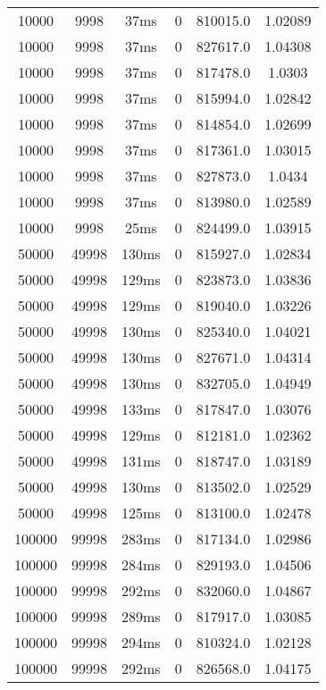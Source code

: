\documentclass[./main.tex]{subfiles}
\begin{document}
\begin{table}
\begin{tabular}{ c | c | c | c | c | c }
        10000 & 9998 & 37ms & 0 & 810015.0 & 1.02089 \\
        10000 & 9998 & 37ms & 0 & 827617.0 & 1.04308 \\
        \rowcolor{lightgray} 10000 & 9998 & 37ms & 0 & 817478.0 & 1.0303 \\
        10000 & 9998 & 37ms & 0 & 815994.0 & 1.02842 \\
        10000 & 9998 & 37ms & 0 & 814854.0 & 1.02699 \\
        10000 & 9998 & 37ms & 0 & 817361.0 & 1.03015 \\
        10000 & 9998 & 37ms & 0 & 827873.0 & 1.0434 \\
        10000 & 9998 & 37ms & 0 & 813980.0 & 1.02589 \\
        10000 & 9998 & 25ms & 0 & 824499.0 & 1.03915 \\
        \hline
        50000 & 49998 & 130ms & 0 & 815927.0 & 1.02834 \\
        50000 & 49998 & 129ms & 0 & 823873.0 & 1.03836 \\
        50000 & 49998 & 129ms & 0 & 819040.0 & 1.03226 \\
        50000 & 49998 & 130ms & 0 & 825340.0 & 1.04021 \\
        50000 & 49998 & 130ms & 0 & 827671.0 & 1.04314 \\
        50000 & 49998 & 130ms & 0 & 832705.0 & 1.04949 \\
        50000 & 49998 & 133ms & 0 & 817847.0 & 1.03076 \\
        50000 & 49998 & 129ms & 0 & 812181.0 & 1.02362 \\
        \rowcolor{lightgray} 50000 & 49998 & 131ms & 0 & 818747.0 & 1.03189 \\
        50000 & 49998 & 130ms & 0 & 813502.0 & 1.02529 \\
        50000 & 49998 & 125ms & 0 & 813100.0 & 1.02478 \\
        \hline
        100000 & 99998 & 283ms & 0 & 817134.0 & 1.02986 \\
        100000 & 99998 & 284ms & 0 & 829193.0 & 1.04506 \\
        100000 & 99998 & 292ms & 0 & 832060.0 & 1.04867 \\
        100000 & 99998 & 289ms & 0 & 817917.0 & 1.03085 \\
        100000 & 99998 & 294ms & 0 & 810324.0 & 1.02128 \\
        100000 & 99998 & 292ms & 0 & 826568.0 & 1.04175 \\

\end{tabular}
\end{table}
\end{document}
